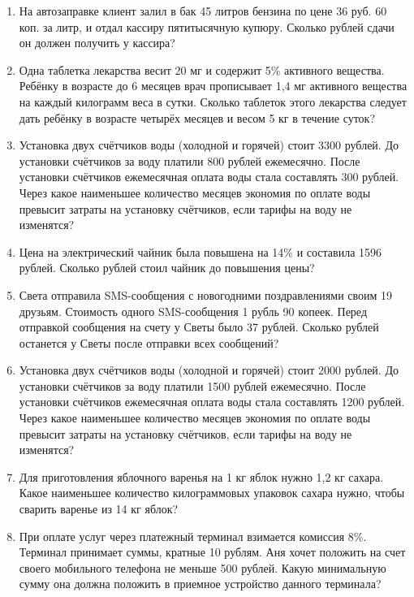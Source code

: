 \begin{enumerate}
	\item На автозаправке клиент залил в бак 45 литров бензина по цене 36 руб. 60 коп. за 
	литр,  и  отдал  кассиру  пятитысячную  купюру.  Сколько  рублей  сдачи  он  должен 
	получить у кассира?
	
	\item Одна таблетка лекарства весит 20 мг и содержит 5\% активного вещества. Ребёнку в 
	возрасте  до  6  месяцев  врач  прописывает  1,4  мг  активного  вещества  на  каждый 
	килограмм  веса  в  сутки.  Сколько  таблеток  этого  лекарства  следует  дать  ребёнку  в 
	возрасте четырёх месяцев и весом 5 кг в течение суток? 
	
	\item Установка  двух  счётчиков  воды  (холодной  и  горячей)  стоит  3300  рублей.  До 
	установки  счётчиков  за  воду  платили  800  рублей  ежемесячно.  После  установки 
	счётчиков  ежемесячная  оплата  воды  стала  составлять  300  рублей.  Через  какое 
	наименьшее  количество  месяцев  экономия  по  оплате  воды  превысит  затраты  на 
	установку счётчиков, если тарифы на воду не изменятся? 
	
	\item Цена  на  электрический  чайник  была  повышена  на  14\%  и  составила  1596  рублей. 
	Сколько рублей стоил чайник до повышения цены?
	
	\item Света  отправила  SMS-сообщения  с  новогодними  поздравлениями  своим  19 
	друзьям. Стоимость одного SMS-сообщения  1  рубль  90  копеек.  Перед  отправкой  
	сообщения  на  счету  у  Светы  было  37  рублей. Сколько рублей останется у Светы 
	после отправки всех сообщений? 
	
	\item Установка  двух  счётчиков  воды  (холодной  и  горячей)  стоит  2000  рублей.  До 
	установки  счётчиков  за  воду  платили  1500  рублей  ежемесячно.  После  установки 
	счётчиков  ежемесячная  оплата  воды  стала  составлять  1200  рублей.  Через  какое 
	наименьшее  количество  месяцев  экономия  по  оплате  воды  превысит  затраты  на 
	установку счётчиков, если тарифы на воду не изменятся?
	
	\item Для  приготовления  яблочного  варенья  на  1  кг  яблок  нужно  1,2  кг  сахара.  Какое 
	наименьшее  количество  килограммовых  упаковок  сахара  нужно,  чтобы  сварить 
	варенье из 14 кг яблок?
	
	\item При    оплате    услуг    через    платежный    терминал    взимается    комиссия    8\%.  
	Терминал  принимает  суммы, кратные 10 рублям. Аня хочет положить на счет своего 
	мобильного телефона не меньше 500 рублей. Какую минимальную сумму она должна 
	положить в приемное устройство данного терминала? 
	

\end{enumerate}
